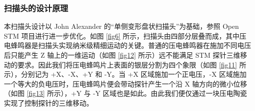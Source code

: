 \documentclass[zihao=-4]{ctexart}
\begin{document}
\begin{spacing}{1.5}
		\subsubsection{扫描头的设计原理}
			本扫描头设计以 John Alexander 的“单侧变形盘状扫描头”\cite{ref13}为基础，参照 Open STM 项目\cite{ref17}进行进一步优化。如图 \ref{fig6} 所示，扫描头由四部分层叠而成，其中压电蜂鸣器是扫描头实现纳米级精细运动的关键。普通的压电蜂鸣器在施加不同电压后只能产生 Z 轴上的一维运动（如图 \ref{fig12} 所示）远不能满足 STM 探针三维移动的要求。因此我们将压电蜂鸣片上表面的银层分割为四个象限（如图 \ref{fig11} 所示），分别记为 +X、-X、+Y 和 -Y。当 +X 区域施加一个正电压，-X 区域施加一个等大的负电压时，压电蜂鸣片便会带动探针产生一个沿 X 轴方向的微小位移（如图 \ref{fig13} 所示），+Y 与 -Y 区域也是如此。由此我们便仅通过一块压电陶瓷实现了控制探针的三维移动。
			\begin{figure}[!h]
				\centering
				\begin{subfigure}{0.47\textwidth}
					\centering
\end{subfigure}
\end{figure}
\end{spacing}
\end{document}
